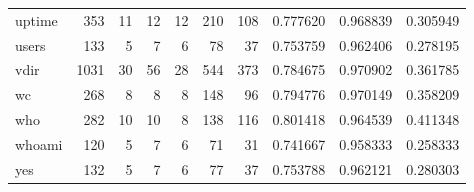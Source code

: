 \begin{longtable}{lrrrrrrrrr}
uptime    &                    353 &                                 11 &                                12 &                               12 &                               210 &                             108 &                                0.777620 &                               0.968839 &                             0.305949 \\
users     &                    133 &                                  5 &                                 7 &                                6 &                                78 &                              37 &                                0.753759 &                               0.962406 &                             0.278195 \\
vdir      &                   1031 &                                 30 &                                56 &                               28 &                               544 &                             373 &                                0.784675 &                               0.970902 &                             0.361785 \\
wc        &                    268 &                                  8 &                                 8 &                                8 &                               148 &                              96 &                                0.794776 &                               0.970149 &                             0.358209 \\
who       &                    282 &                                 10 &                                10 &                                8 &                               138 &                             116 &                                0.801418 &                               0.964539 &                             0.411348 \\
whoami    &                    120 &                                  5 &                                 7 &                                6 &                                71 &                              31 &                                0.741667 &                               0.958333 &                             0.258333 \\
yes       &                    132 &                                  5 &                                 7 &                                6 &                                77 &                              37 &                                0.753788 &                               0.962121 &                             0.280303 \\
\end{longtable}
